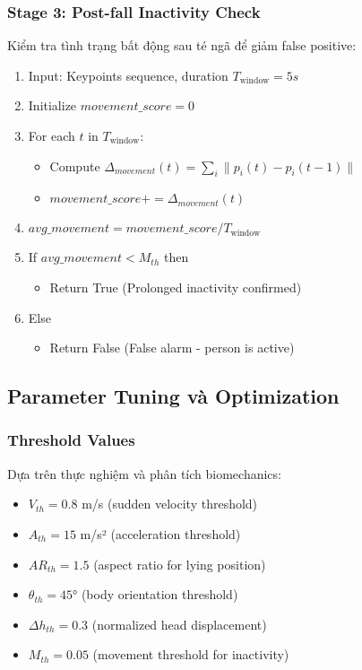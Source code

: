 \subsubsection{Stage 3: Post-fall Inactivity Check}
Kiểm tra tình trạng bất động sau té ngã để giảm false positive:
\begin{enumerate}
\item Input: Keypoints sequence, duration $T_{\text{window}} = 5s$
\item Initialize $movement\_score = 0$
\item For each $t$ in $T_{\text{window}}$:
\begin{itemize}
    \item Compute $\Delta_{movement}(t) = \sum_i \|p_i(t) - p_i(t-1)\|$
    \item $movement\_score += \Delta_{movement}(t)$
\end{itemize}
\item $avg\_movement = movement\_score / T_{\text{window}}$
\item If $avg\_movement < M_{th}$ then
\begin{itemize}
    \item Return True (Prolonged inactivity confirmed)
\end{itemize}
\item Else
\begin{itemize}
    \item Return False (False alarm - person is active)
\end{itemize}
\end{enumerate}

\subsection{Parameter Tuning và Optimization}

\subsubsection{Threshold Values}
Dựa trên thực nghiệm và phân tích biomechanics:
\begin{itemize}
    \item $V_{th} = 0.8$ m/s (sudden velocity threshold)
    \item $A_{th} = 15$ m/s² (acceleration threshold)
    \item $AR_{th} = 1.5$ (aspect ratio for lying position)
    \item $\theta_{th} = 45°$ (body orientation threshold)
    \item $\Delta h_{th} = 0.3$ (normalized head displacement)
    \item $M_{th} = 0.05$ (movement threshold for inactivity)
\end{itemize}

